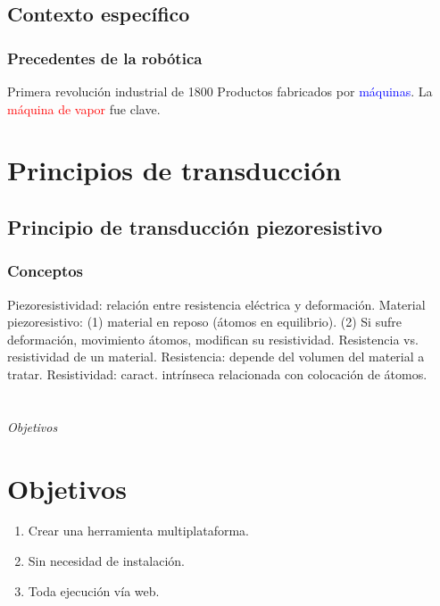 \documentclass{beamer}
\begin{document}
\subsection{Contexto específico}
\begin{frame}
\frametitle{Precedentes de la robótica}
\begin{block}{Primera revolución industrial de 1800}
Productos fabricados por \textcolor{blue}{máquinas}. La \textcolor{red}{máquina de vapor} fue clave.
\end{block}
\end{frame}

\section{Principios de transducción}
\subsection{Principio de transducción piezoresistivo}
\begin{frame}
\frametitle{Conceptos}
\begin{outline}
\1 Piezoresistividad: relación entre resistencia eléctrica y deformación.
\2 Material piezoresistivo: (1) material en reposo (átomos en equilibrio).
\3 (2) Si sufre deformación, movimiento átomos, modifican su resistividad.
\2 Resistencia vs. resistividad de un material.
\3 Resistencia: depende del volumen del material a tratar.
\3 Resistividad: caract. intrínseca relacionada con colocación de átomos.
\end{outline}
\end{frame}

\section*{}
\begin{frame}{}
  \centering \Huge
  \emph{Objetivos}
\end{frame}

\section{Objetivos}
\begin{frame}
\begin{enumerate}
\item Crear una herramienta multiplataforma.
\item Sin necesidad de instalación.
\item Toda ejecución vía web.
\end{enumerate}
\end{frame}
\end{document}
